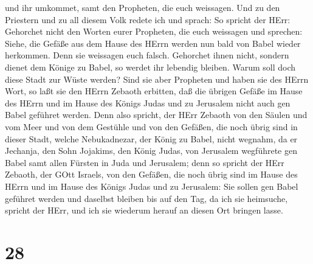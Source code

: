 und ihr umkommet, samt den Propheten, die euch weissagen. 
Und zu den Priestern und zu all diesem Volk redete ich und sprach: So
spricht der HErr: Gehorchet nicht den Worten eurer Propheten, die euch
weissagen und sprechen: Siehe, die Gefäße aus dem Hause des HErrn werden
nun bald von Babel wieder herkommen. Denn sie weissagen euch falsch.
 Gehorchet ihnen nicht, sondern dienet dem Könige zu Babel,
so werdet ihr lebendig bleiben. Warum soll doch diese Stadt zur Wüste
werden?  Sind sie aber Propheten und haben sie des HErrn
Wort, so laßt sie den HErrn Zebaoth erbitten, daß die übrigen Gefäße im
Hause des HErrn und im Hause des Königs Judas und zu Jerusalem nicht
auch gen Babel geführet werden.  Denn also spricht, der
HErr Zebaoth von den Säulen und vom Meer und von dem Gestühle und von
den Gefäßen, die noch übrig sind in dieser Stadt,  welche
Nebukadnezar, der König zu Babel, nicht wegnahm, da er Jechanja, den
Sohn Jojakims, den König Judas, von Jerusalem wegführete gen Babel samt
allen Fürsten in Juda und Jerusalem;  denn so spricht der
HErr Zebaoth, der GOtt Israels, von den Gefäßen, die noch übrig sind im
Hause des HErrn und im Hause des Königs Judas und zu Jerusalem:
 Sie sollen gen Babel geführet werden und daselbst bleiben
bis auf den Tag, da ich sie heimsuche, spricht der HErr, und ich sie
wiederum herauf an diesen Ort bringen lasse.

\hypertarget{section-27}{%
\section{28}\label{section-27}}

